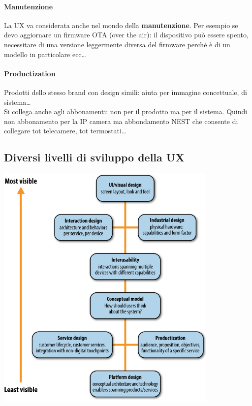 \documentclass[10pt]{article}
\begin{document}
\paragraph{Manutenzione} La UX va considerata anche nel mondo della \textbf{manutenzione}. Per esempio se devo aggiornare un firmware OTA (over the air): il dispositivo può essere spento, necessitare di una versione leggermente diversa del firmware perché è di un modello in particolare ecc\ldots
\paragraph{Productization} Prodotti dello stesso brand con design simili: aiuta per immagine concettuale, di sistema\ldots\\
Si collega anche agli abbonamenti: non per il prodotto ma per il sistema. Quindi non abbonamento per la IP camera ma abbondamento NEST che consente di collegare tot telecamere, tot termostati\ldots
\pagebreak
\subsection{Diversi livelli di sviluppo della UX}
\begin{center}
\includegraphics[scale=1]{iotuxflow.png}
\end{center}
\pagebreak
\end{document}
